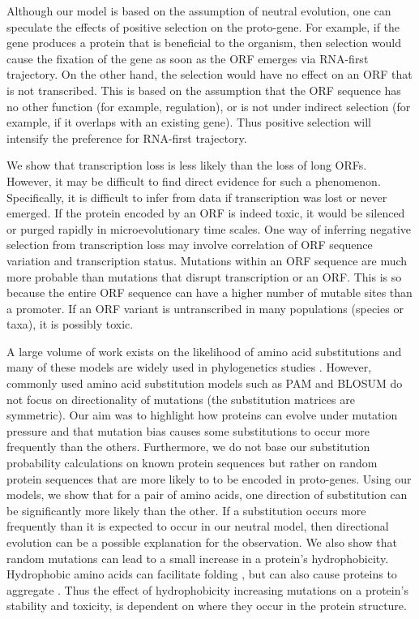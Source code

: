 \documentclass[12pt,a4paper]{article}
\begin{document}
Although our model is based on the assumption of neutral evolution, one can speculate the effects of positive selection on the proto-gene. For example, if the gene produces a protein that is beneficial to the organism, then selection would cause the fixation of the gene as soon as the ORF emerges via RNA-first trajectory. On the other hand, the selection would have no effect on an ORF that is not transcribed. This is based on the assumption that the ORF sequence has no other function (for example, regulation), or is not under indirect selection (for example, if it overlaps with an existing gene). Thus positive selection will intensify the preference for RNA-first trajectory.

We show that transcription loss is less likely than the loss of long ORFs. However, it may be difficult to find direct evidence for such a phenomenon. Specifically, it is difficult to infer from data if transcription was lost or never emerged. If the protein encoded by an ORF is indeed toxic, it would be silenced or purged rapidly in microevolutionary time scales. One way of inferring negative selection from transcription loss may involve correlation of ORF sequence variation and transcription status. Mutations within an ORF sequence are much more probable than mutations that disrupt transcription or an ORF. This is so because the entire ORF sequence can have a higher number of mutable sites than a promoter. If an ORF variant is untranscribed in many populations (species or taxa), it is possibly toxic.  

A large volume of work exists on the likelihood of amino acid substitutions and many of these models are widely used in phylogenetics studies \citep{aasubOhta,PAM,blosum,submat92,submat92j,submat01,submat05,submat07,submat08}. However, commonly used amino acid substitution models such as PAM and BLOSUM \citep{PAM,blosum} do not focus on directionality of mutations (the substitution matrices are symmetric). Our aim was to highlight how proteins can evolve under mutation pressure and that mutation bias causes some substitutions to occur more frequently than the others. Furthermore, we do not base our substitution probability calculations on known protein sequences but rather on random protein sequences that are more likely to to be encoded in proto-genes. Using our models, we show that for a pair of amino acids, one direction of substitution can be significantly more likely than the other. If a substitution occurs more frequently than it is expected to occur in our neutral model, then directional evolution can be a possible explanation for the observation. We also show that random mutations can lead to a small increase in a protein's hydrophobicity. Hydrophobic amino acids can facilitate folding \citep{Dill1985}, but can also cause proteins to aggregate \citep{hydrophobicRatchet}. Thus the effect of hydrophobicity increasing mutations on a protein's stability and toxicity, is dependent on where they occur in the protein structure.
\end{document}
